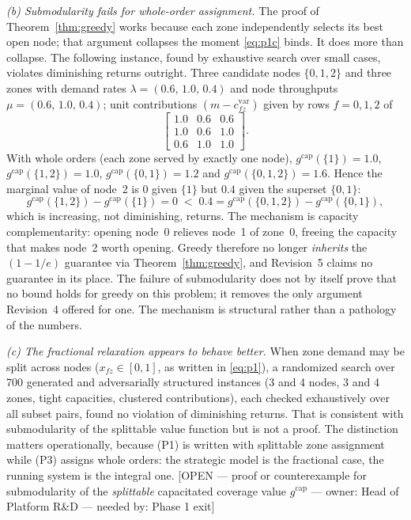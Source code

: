 \documentclass[10pt,twocolumn,letterpaper]{article}
\theoremstyle{definition}
\newcommand{\OPEN}[3]{{\color{openred}\footnotesize\textsf{[OPEN --- #1 --- owner: #2 --- needed by: #3]}}}
\begin{document}
\emph{(b) Submodularity fails for whole-order assignment.} The proof of Theorem~\ref{thm:greedy} works because each zone independently selects its best open node; that argument collapses the moment \eqref{eq:p1c} binds. It does more than collapse. The following instance, found by exhaustive search over small cases, violates diminishing returns outright. Three candidate nodes $\{0,1,2\}$ and three zones with demand rates $\lambda=(0.6,\,1.0,\,0.4)$ and node throughputs $\mu=(0.6,\,1.0,\,0.4)$; unit contributions $(m-c^{\mathrm{var}}_{fz})$ given by rows $f=0,1,2$ of
\[
\begin{bmatrix}1.0&0.6&0.6\\ 1.0&0.6&1.0\\ 0.6&1.0&1.0\end{bmatrix}.
\]
With whole orders (each zone served by exactly one node), $g^{\mathrm{cap}}(\{1\})=1.0$, $g^{\mathrm{cap}}(\{1,2\})=1.0$, $g^{\mathrm{cap}}(\{0,1\})=1.2$ and $g^{\mathrm{cap}}(\{0,1,2\})=1.6$. Hence the marginal value of node~2 is $0$ given $\{1\}$ but $0.4$ given the superset $\{0,1\}$:
\[
g^{\mathrm{cap}}(\{1,2\})-g^{\mathrm{cap}}(\{1\})=0 \;<\; 0.4 = g^{\mathrm{cap}}(\{0,1,2\})-g^{\mathrm{cap}}(\{0,1\}),
\]
which is increasing, not diminishing, returns. The mechanism is capacity complementarity: opening node~0 relieves node~1 of zone~0, freeing the capacity that makes node~2 worth opening. Greedy therefore no longer \emph{inherits} the $(1-1/e)$ guarantee via Theorem~\ref{thm:greedy}, and Revision~5 claims no guarantee in its place. The failure of submodularity does not by itself prove that no bound holds for greedy on this problem; it removes the only argument Revision~4 offered for one. The mechanism is structural rather than a pathology of the numbers.

\emph{(c) The fractional relaxation appears to behave better.} When zone demand may be split across nodes ($x_{fz}\in[0,1]$, as written in \eqref{eq:p1}), a randomized search over 700 generated and adversarially structured instances (3 and 4 nodes, 3 and 4 zones, tight capacities, clustered contributions), each checked exhaustively over all subset pairs, found no violation of diminishing returns. That is consistent with submodularity of the splittable value function but is not a proof. The distinction matters operationally, because (P1) is written with splittable zone assignment while (P3) assigns whole orders: the strategic model is the fractional case, the running system is the integral one. \OPEN{proof or counterexample for submodularity of the \emph{splittable} capacitated coverage value $g^{\mathrm{cap}}$}{Head of Platform R\&D}{Phase 1 exit}
\end{document}
